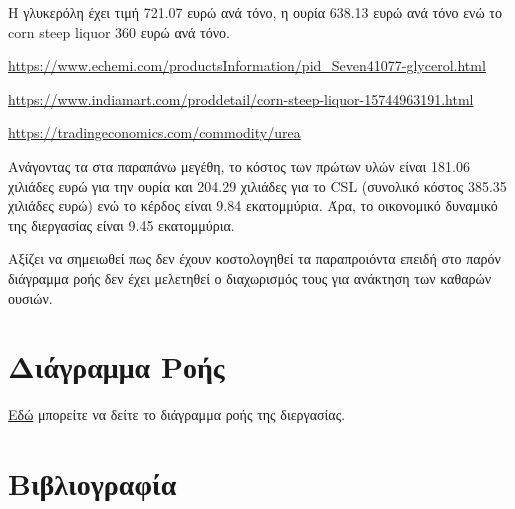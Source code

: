 \documentclass[11pt]{article}
\begin{document}
Η γλυκερόλη έχει τιμή 721.07 ευρώ ανά τόνο, η ουρία 638.13 ευρώ ανά τόνο ενώ το corn steep liquor 360 ευρώ ανά τόνο.

\url{https://www.echemi.com/productsInformation/pid\_Seven41077-glycerol.html}

\url{https://www.indiamart.com/proddetail/corn-steep-liquor-15744963191.html}

\url{https://tradingeconomics.com/commodity/urea}

Ανάγοντας τα στα παραπάνω μεγέθη, το κόστος των πρώτων υλών είναι 181.06 χιλιάδες ευρώ για την ουρία και 204.29 χιλιάδες για το CSL (συνολικό κόστος 385.35 χιλιάδες ευρώ) ενώ το κέρδος είναι 9.84 εκατομμύρια. Άρα, το οικονομικό δυναμικό της διεργασίας είναι 9.45 εκατομμύρια.

Αξίζει να σημειωθεί πως δεν έχουν κοστολογηθεί τα παραπροιόντα επειδή στο παρόν διάγραμμα ροής δεν έχει μελετηθεί ο διαχωρισμός τους για ανάκτηση των καθαρών ουσιών.

\section{Διάγραμμα Ροής}
\label{sec:org3e7a5b5}
\href{https://github.com/Vidianos-Giannitsis/Process-Design/blob/master/Diagrams/flowsheet\_initial.pdf}{Εδώ} μπορείτε να δείτε το διάγραμμα ροής της διεργασίας.

\section{Βιβλιογραφία}
\label{sec:org97c9c5f}


\end{document}
